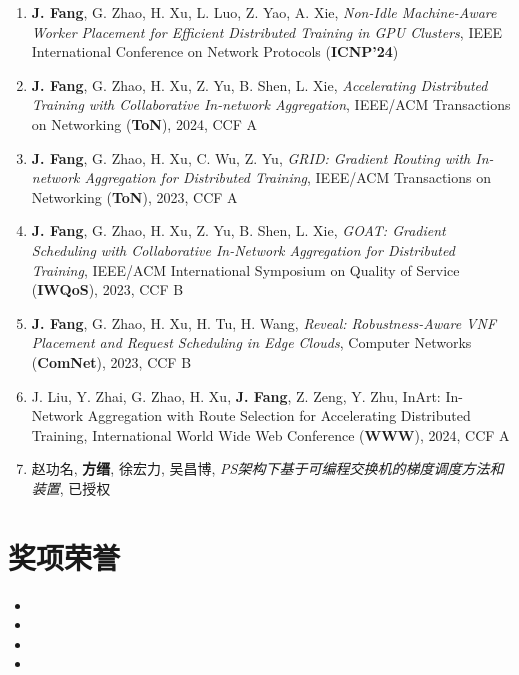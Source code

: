 \documentclass{resume}
\begin{document}
\begin{enumerate}[parsep=0.5ex]
  \item \textbf{J. Fang}, G. Zhao, H. Xu, L. Luo, Z. Yao, A. Xie, \textit{Non-Idle Machine-Aware Worker Placement for Efficient Distributed Training in GPU Clusters}, IEEE International Conference on Network Protocols (\textbf{ICNP'24})
  \item \textbf{J. Fang}, G. Zhao, H. Xu, Z. Yu, B. Shen, L. Xie, \textit{Accelerating Distributed Training with Collaborative In-network Aggregation}, IEEE/ACM Transactions on Networking (\textbf{ToN}), 2024, CCF A
  \item \textbf{J. Fang}, G. Zhao, H. Xu, C. Wu, Z. Yu, \textit{GRID: Gradient Routing with In-network Aggregation for Distributed Training}, IEEE/ACM Transactions on Networking (\textbf{ToN}), 2023, CCF A
  \item \textbf{J. Fang}, G. Zhao, H. Xu, Z. Yu, B. Shen, L. Xie, \textit{GOAT: Gradient Scheduling with Collaborative In-Network Aggregation for Distributed Training}, IEEE/ACM International Symposium on Quality of Service (\textbf{IWQoS}), 2023, CCF B
  \item \textbf{J. Fang}, G. Zhao, H. Xu, H. Tu, H. Wang, \textit{Reveal: Robustness-Aware VNF Placement and Request Scheduling in Edge Clouds}, Computer Networks (\textbf{ComNet}), 2023, CCF B
  \item J. Liu, Y. Zhai, G. Zhao, H. Xu, \textbf{J. Fang}, Z. Zeng, Y. Zhu, InArt: In-Network Aggregation with Route Selection for Accelerating Distributed Training, International World Wide Web Conference (\textbf{WWW}), 2024, CCF A
  \item 赵功名, \textbf{方缙}, 徐宏力, 吴昌博, \textit{PS架构下基于可编程交换机的梯度调度方法和装置}, 已授权
\end{enumerate}

\section{奖项荣誉}

\begin{itemize}[parsep=0.5ex]
  \item {}
  \item {}
  \item {}
  \item {}
\end{itemize}


\end{document}
